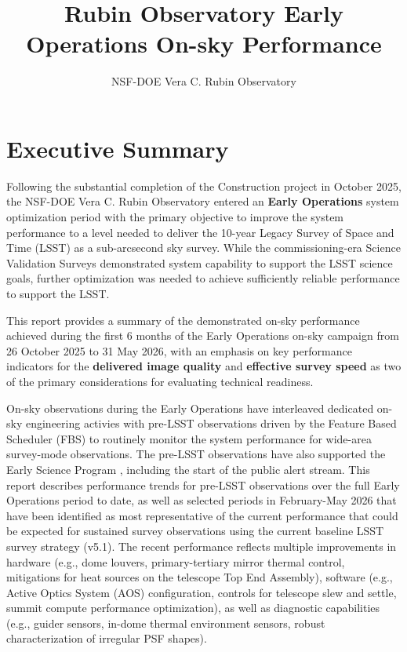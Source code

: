 \documentclass[OPS,lsst,authoryear,toc]{lsstdoc}
\title{Rubin Observatory Early Operations On-sky Performance}
\author{%
NSF-DOE Vera C. Rubin Observatory
}
\date{\vcsDate}
\begin{document}
\maketitle


\section{Executive Summary}

Following the substantial completion of the Construction project in October 2025, the NSF-DOE Vera C. Rubin Observatory entered an \textbf{Early Operations} system optimization period with the primary objective to improve the system performance to a level needed to deliver the 10-year Legacy Survey of Space and Time (LSST) as a sub-arcsecond sky survey.
While the commissioning-era Science Validation Surveys demonstrated system capability to support the LSST science goals, further optimization was needed to achieve sufficiently reliable performance to support the LSST.

This report provides a summary of the demonstrated on-sky performance achieved during the first 6 months of the Early Operations on-sky campaign from 26 October 2025 to 31 May 2026, with an emphasis on key performance indicators for the \textbf{delivered image quality} and \textbf{effective survey speed} as two of the primary considerations for evaluating technical readiness.

On-sky observations during the Early Operations have interleaved dedicated on-sky engineering activies with pre-LSST observations driven by the Feature Based Scheduler (FBS) to routinely monitor the system performance for wide-area survey-mode observations.
The pre-LSST observations have also supported the Early Science Program , including the start of the public alert stream.
This report describes performance trends for pre-LSST observations over the full Early Operations period to date, as well as selected periods in February-May 2026 that have been identified as most representative of the current performance that could be expected for sustained survey observations using the current baseline LSST survey strategy (v5.1).
The recent performance reflects multiple improvements in hardware (e.g., dome louvers, primary-tertiary mirror thermal control, mitigations for heat sources on the telescope Top End Assembly), software (e.g., Active Optics System (AOS) configuration, controls for telescope slew and settle, summit compute performance optimization), as well as diagnostic capabilities (e.g., guider sensors, in-dome thermal environment sensors, robust characterization of irregular PSF shapes).
\end{document}
